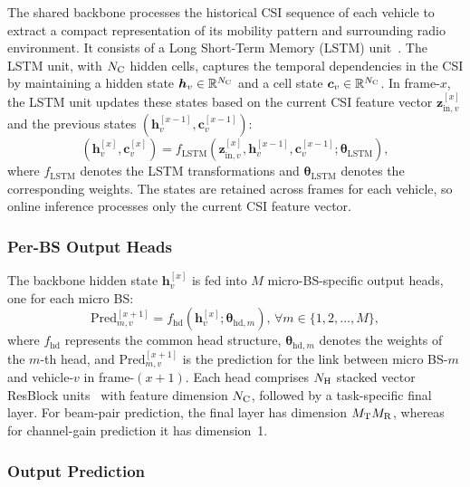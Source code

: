 \documentclass[10pt,journal,letterpaper]{IEEEtran}
\newcommand{\rev}[1]{\textcolor{revisioncolor}{{}#1}}
\theoremstyle{remark}
\begin{document}
The shared backbone processes the historical CSI sequence of each vehicle to extract a compact representation of its mobility pattern and surrounding radio environment. It consists of a Long Short-Term Memory (LSTM) unit~\cite{lstm}. 
The LSTM unit, with $N_{\rm C}$ hidden cells, captures the temporal dependencies in the CSI by maintaining a hidden state $\bm{h}_v \in \mathbb{R}^{N_{\rm C}}$ and a cell state $\bm{c}_v \in \mathbb{R}^{N_{\rm C}}$. In frame-$x$, the LSTM unit updates these states based on the current CSI feature vector $\bm{z}_{\text{in},v}^{[x]}$ and the previous states $(\bm{h}_v^{[x-1]}, \bm{c}_v^{[x-1]})$:
\begin{equation}
\label{eq:lstm_update}
    \left(\bm{h}_v^{[x]}, \bm{c}_v^{[x]}\right) = f_{\text{LSTM}} \left(\bm{z}_{\text{in},v}^{[x]}, \bm{h}_v^{[x-1]}, \bm{c}_v^{[x-1]} ;\bm{\theta}_{\text{LSTM}} \right),
\end{equation}
where $f_{\text{LSTM}}$ denotes the LSTM transformations and $\bm{\theta}_{\text{LSTM}}$ denotes the corresponding weights. 
\rev{The states are retained across frames for each vehicle, so online inference processes only the current CSI feature vector.}

\subsubsection{Per-BS Output Heads}
The backbone hidden state $\bm{h}_v^{[x]}$ is fed into $M$ micro-BS-specific output heads, one for each micro BS:
\begin{equation}
\label{eq:OutputHead}
    \text{Pred}_{m,v}^{[x+1]} = f_{\text{hd}} \left(\bm{h}_v^{[x]};\bm{\theta}_{\text{hd},m} \right), \, \forall m \in \{1,2,\dots,M\},
\end{equation}
where $f_{\text{hd}}$ represents the common head structure, 
$\bm{\theta}_{\text{hd},m}$ denotes the weights of the $m$-th head, and $\text{Pred}_{m,v}^{[x+1]}$ is the prediction for the link between micro BS-$m$ and vehicle-$v$ in frame-$(x\!+\!1)$.
Each head comprises $N_{\rm H}$ stacked vector ResBlock units~\cite{He2016} with feature dimension $N_{\rm C}$, followed by a task-specific final layer. For beam-pair prediction, the final layer has dimension $M_{\rm T}M_{\rm R}$, whereas for channel-gain prediction it has dimension~1.



\subsubsection{Output Prediction}
\end{document}
